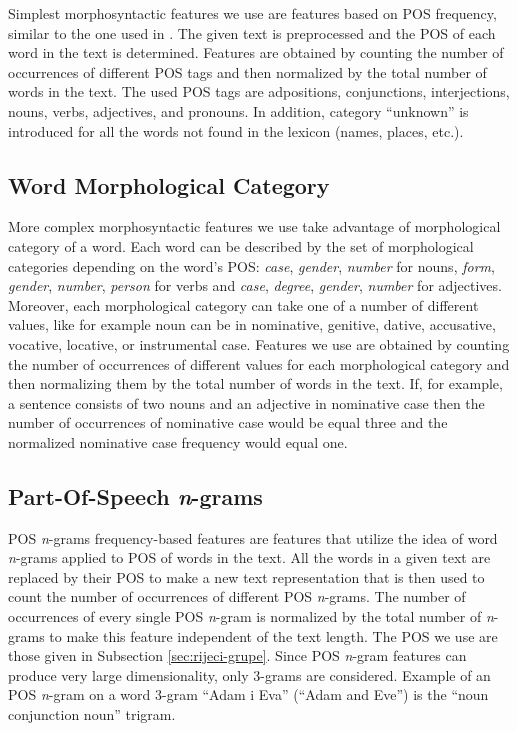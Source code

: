\documentclass{llncs}
\begin{document}
Simplest morphosyntactic features we use are features based on POS frequency,
similar to the one used in \cite{kukushkina2001using}. The given text is
preprocessed and the POS of each word in the text is determined. Features are
obtained by counting the number of occurrences of different POS tags and then
normalized by the total number of words in the text. The used POS tags are
adpositions, conjunctions, interjections, nouns, verbs,
adjectives, and pronouns. In addition, category ``unknown'' is introduced for all
the words not found in the lexicon (names, places, etc.).


\subsection{Word Morphological Category}
\label{sec:morphosyntactic}

More complex morphosyntactic features we use take advantage of morphological
category of a word. Each word can be described by the set of morphological
categories depending on the word's POS: \emph{case}, \emph{gender}, \emph{number}
for nouns, \emph{form}, \emph{gender}, \emph{number}, \emph{person} for verbs and
\emph{case}, \emph{degree}, \emph{gender}, \emph{number} for adjectives.
Moreover, each morphological category can take one of a number of different
values, like for example noun can be in nominative, genitive, dative, accusative, vocative,
locative, or instrumental case. Features we use are obtained by counting the
number of occurrences of different values for each morphological category and
then normalizing them by the total number of words in the text. If, for example,
a sentence consists of two nouns and an adjective in nominative case then the
number of occurrences of nominative case would be equal three and the normalized
nominative case frequency would equal one.

\subsection{Part-Of-Speech \emph{n}-grams}
\label{sec:ngrami-tipova}
POS \emph{n}-grams frequency-based features are features that utilize the idea of
word \emph{n}-grams applied to POS of words in the text. All the words in a given
text are replaced by their POS to make a new text representation that is then
used to count the number of occurrences of different POS \emph{n}-grams. The
number of occurrences of every single POS \emph{n}-gram is normalized by the
total number of \emph{n}-grams to make this feature independent of the text
length. The POS we use are those given in Subsection \ref{sec:rijeci-grupe}.
Since POS \emph{n}-gram features can produce very large dimensionality, only
3-grams are considered. Example of an POS \emph{n}-gram on a word 3-gram ``Adam i
Eva'' (``Adam and Eve'') is the ``noun conjunction noun'' trigram.
\end{document}
